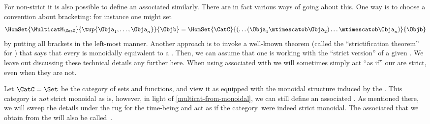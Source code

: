 
    \begin{example}
    \end{example}



    \begin{example}
    \end{example}



    \begin{example}
    \end{example}


\begin{remark}
    \label{multicat-from-monoidal}
    For non-strict  it is also possible to define an associated  similarly.
    There are in fact various ways of going about this.
    One way is to choose a convention about bracketing: for instance one might set
    \begin{equation}
        \HomSet{\MulticatM_\CatC}{\tup{\Obja_1,\ldots,\Obja_n}}{\Objb}=\HomSet{\CatC}{ ( \dots (\Obja_1 \mtimescatob \Obja_2) \ldots \mtimescatob \Obja_n)}{\Objb}
    \end{equation}
    by putting all brackets in the left-most manner.
    Another approach is to invoke a well-known theorem (called the ``strictification theorem'' for ) that says that every  is monoidally equivalent to a .
    Then, we can assume that one is working with the ``strict version'' of a given .
    We leave out discussing these technical details any further here.
    When using  associated with  we will sometimes simply act ``as if'' our  are strict, even when they are not.
\end{remark}

\begin{example}
    Let $\CatC = \Set$ be the category of sets and functions, and view it as equipped with the monoidal structure induced by the .
    This category is \emph{not} strict monoidal as is, however, in light of \cref{multicat-from-monoidal}, we can still define an associated .
    As mentioned there, we will sweep the details under the rug for the time-being and act as if the category~\Set were indeed strict monoidal.
    The associated  that we obtain from the  \Set will also be called~\Set.
\end{example}


